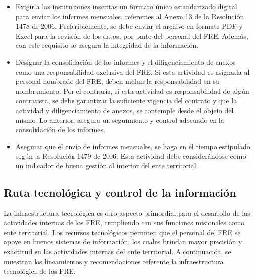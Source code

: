 \documentclass[
  oneside]{book}
\begin{document}
\begin{itemize}
\item
  Exigir a las instituciones inscritas un formato único estandarizado digital para enviar los informes mensuales, referentes al Anexo 13 de la Resolución 1478 de 2006. Preferiblemente, se debe enviar el archivo en formato PDF y Excel para la revisión de los datos, por parte del personal del FRE. Además, con este requisito se asegura la integridad de la información.
\item
  Designar la consolidación de los informes y el diligenciamiento de anexos como una responsabilidad exclusiva del FRE. Si esta actividad es asignada al personal nombrado del FRE, deben incluir la responsabilidad en su nombramiento. Por el contrario, si esta actividad es responsabilidad de algún contratista, se debe garantizar la suficiente vigencia del contrato y que la actividad y diligenciamiento de anexos, se contemple desde el objeto del mismo. Lo anterior, asegura un seguimiento y control adecuado en la consolidación de los informes.
\item
  Asegurar que el envío de informes mensuales, se haga en el tiempo estipulado según la Resolución 1479 de 2006. Esta actividad debe considerándose como un indicador de buena gestión al interior del ente territorial.
\end{itemize}

\hypertarget{ruta-tecnoluxf3gica-y-control-de-la-informaciuxf3n}{%
\subsection{Ruta tecnológica y control de la información}\label{ruta-tecnoluxf3gica-y-control-de-la-informaciuxf3n}}

La infraestructura tecnológica es otro aspecto primordial para el desarrollo de las actividades internas de los FRE, cumpliendo con sus funciones misionales como ente territorial. Los recursos tecnológicos permiten que el personal del FRE se apoye en buenos sistemas de información, los cuales brindan mayor precisión y exactitud en las actividades internas del ente territorial. A continuación, se muestran los lineamientos y recomendaciones referente la infraestructura tecnológica de los FRE:
\end{document}
